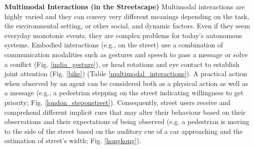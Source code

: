\documentclass[a4paper]{article}
\begin{document}
\textbf{\sffamily Multimodal Interactions (in the Streetscape)} \quad Multimodal interactions are highly varied and they can convey very different meanings depending on the task, the environmental setting, or other social, and dynamic factors. Even if they seem everyday monotonic events, they are complex problems for today's autonomous systems. Embodied interactions (e.g., on the street) use a combination of communication modalities such as gestures and speech to pass a message or solve a conflict (Fig. \ref{india_gesture}), or head rotations and eye contact to establish joint attention (Fig. \ref{bike})  (Table \ref{multimodal_interactions}). A practical action when observed by an agent can be considered both as a physical action as well as a message (e.g., a pedestrian stepping on the street indicating willingness to get priority; Fig. \ref{london_steponstreet}). Consequently, street users receive and comprehend different implicit cues that may alter their behaviour  based on their observations and their expectations of being observed (e.g. a pedestrian is moving to the side of the street based on the auditory cue of a car approaching and the estimation of street's width; Fig. \ref{hongkong}). 
 \smallskip
 
 
\end{document}
